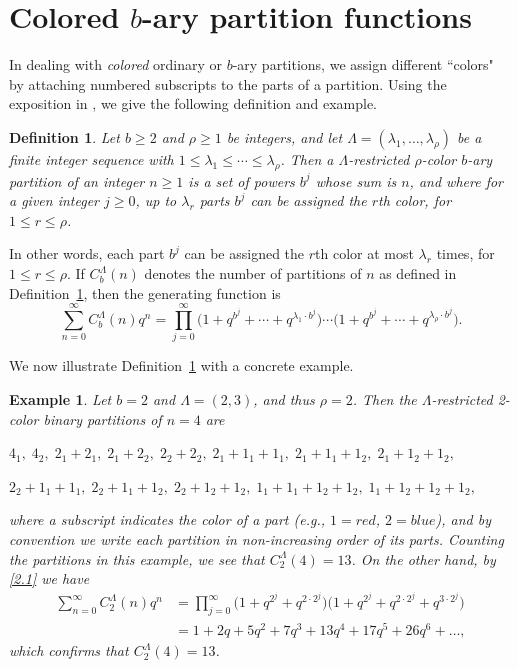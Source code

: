\documentclass{amsart}
\theoremstyle{plain}
\newtheorem{definition}[theorem]{Definition}
\newtheorem{example}[theorem]{Example}
\numberwithin{equation}{section}
\begin{document}
\section{Colored $b$-ary partition functions}\label{sec:2}

In dealing with {\it colored} ordinary or $b$-ary partitions, we assign 
different ``colors" by attaching numbered subscripts to the parts of a
partition. Using the exposition in \cite{DE10}, we give the following 
definition and example.

\begin{definition}\label{def:2.1}
Let $b\geq 2$ and $\rho\geq 1$ be integers, and let
$\Lambda=(\lambda_1,\ldots,\lambda_\rho)$ be a finite integer sequence with
$1\leq\lambda_1\leq\cdots\leq\lambda_\rho$. Then a $\Lambda$-restricted 
$\rho$-color $b$-ary partition of an integer $n\geq 1$ is a set
of powers $b^j$ whose sum is $n$, and where for a given integer 
$j\geq 0$, up to $\lambda_r$ parts $b^j$ can be assigned the $r$th color,
for $1\leq r\leq\rho$.
\end{definition}

In other words, each part $b^j$ can be assigned the $r$th color at most
$\lambda_r$ times, for $1\leq r\leq\rho$. 
If $C_b^\Lambda(n)$ denotes the number of partitions of $n$ as defined in 
Definition~\ref{def:2.1}, then the generating function is
\begin{equation}\label{2.1}
\sum_{n=0}^\infty C_b^\Lambda(n)q^n
= \prod_{j=0}^\infty\bigg(1+q^{b^j}+\cdots+q^{\lambda_1\cdot b^j}\bigg)\cdots
\bigg(1+q^{b^j}+\cdots+q^{\lambda_\rho\cdot b^j}\bigg). 
\end{equation}

We now illustrate Definition~\ref{def:2.1} with a concrete example.

\begin{example}\label{ex:2.2}
{\rm Let $b=2$ and $\Lambda=(2,3)$, and thus $\rho=2$. Then the 
$\Lambda$-restricted 2-color binary partitions of $n=4$ are}

$4_1,\;4_2,\;2_1+2_1,\;2_1+2_2,\;2_2+2_2,\;2_1+1_1+1_1,\;2_1+1_1+1_2,\;
2_1+1_2+1_2,$

$2_2+1_1+1_1,\;2_2+1_1+1_2,\; 2_2+1_2+1_2,\;1_1+1_1+1_2+1_2,\;
1_1+1_2+1_2+1_2,$

\noindent
{\rm where a subscript indicates the color of a part (e.g., $1=red$, $2=blue$),
and by convention we 
write each partition in non-increasing order of its parts.
Counting the partitions in this example, we see that $C_2^\Lambda(4)=13$. 
On the other hand, by \eqref{2.1} we have}
\begin{align}
\sum_{n=0}^\infty C_2^\Lambda(n)q^n
&= \prod_{j=0}^\infty\bigg(1+q^{2^j}+q^{2\cdot 2^j}\bigg)
\bigg(1+q^{2^j}+q^{2\cdot 2^j}+q^{3\cdot 2^j}\bigg)\label{2.2} \\
&= 1+2q+5q^2+7q^3+13q^4+17q^5+26q^6+\ldots,\nonumber
\end{align}
{which confirms that $C_2^\Lambda(4)=13$.}
\end{example}
\end{document}
